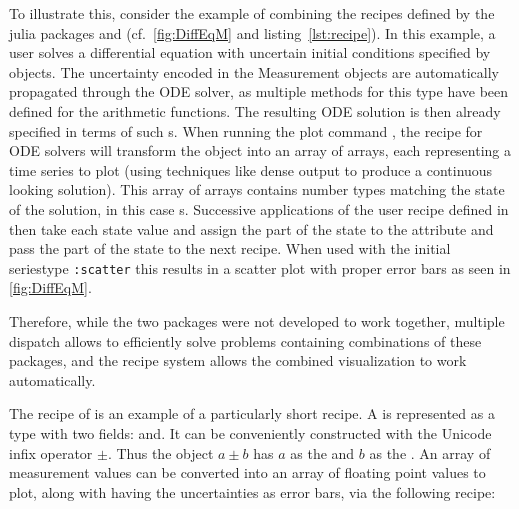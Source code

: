 To illustrate this, consider the example of combining the recipes defined by the julia packages\linebreak {}\cite{rackauckasSciMLDifferentialEquationsJl2022} and \cite{giordanoUncertaintyPropagationFunctionally2016} (cf.~\cref{fig:DiffEqM} and listing~\ref{lst:recipe}).
In this example, a user solves a differential equation with uncertain initial conditions specified by  objects.
The uncertainty encoded in the Measurement objects are automatically propagated through the ODE solver, as multiple methods for this type have been defined for the arithmetic functions.
The resulting ODE solution  is then already specified in terms of such \linebreak{}s.
When running the plot command , the recipe for ODE solvers will transform the  object into an array of arrays, each representing a time series to plot (using techniques like dense output to produce a continuous looking solution).
This array of arrays contains number types matching the state of the solution, in this case s.
Successive applications of the user recipe defined in  then take each state value and assign the  part of the state to the  attribute and pass the  part of the state to the next recipe.
When used with the initial seriestype \texttt{:scatter} this results in a scatter plot with proper error bars as seen in \cref{fig:DiffEqM}.

Therefore, while the two packages were not developed to work together, multiple dispatch allows to  efficiently solve problems containing combinations of these packages, and the \Plots recipe system allows the combined visualization to work automatically.

The recipe of  is an example of a particularly short recipe.
A  is represented as a type with two fields:  and\linebreak {}.
It can be conveniently constructed with the Unicode infix operator $\pm$.
Thus the object  $a \pm b$ has $a$ as the  and $b$ as the .
An array of measurement values can be converted into an array of floating point values to plot, along with having the uncertainties as error bars, via the following recipe:

